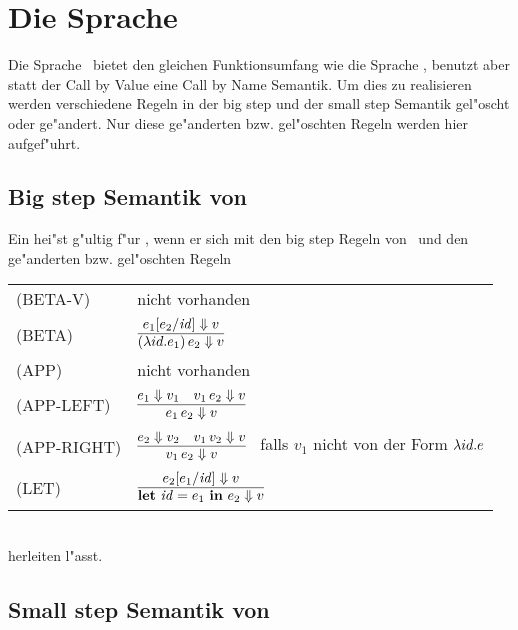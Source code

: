 \section{Die Sprache \LONECBN}

Die Sprache \LONECBN \ bietet den gleichen Funktionsumfang wie die Sprache \LONE, benutzt aber statt der 
Call by Value eine Call by Name Semantik. Um dies zu realisieren werden verschiedene Regeln in der big step 
und der small step Semantik gel"oscht oder ge"andert. Nur diese ge"anderten bzw. gel"oschten Regeln werden hier
aufgef"uhrt.

\subsection{Big step Semantik von \LONECBN}

Ein  hei"st g"ultig f"ur \LONECBN, wenn er sich mit den big step Regeln von \LONE\ und den ge"anderten bzw. gel"oschten Regeln\\[5mm]
  \begin{tabular}{ll}
     \mbox{(BETA-V)}      & nicht vorhanden \\[3mm]
     \mbox{(BETA)}        & $\regel{e_1[e_2/\id] \eval v}
                                   {(\abstr{id}{e_1})\,e_2 \eval v}$ \\[5mm]
     \mbox{(APP)}         & nicht vorhanden \\[3mm]
     \mbox{(APP-LEFT)}    & $\regel{e_1 \eval v_1 \quad v_1\,e_2 \eval v}
                                   {e_1\,e_2 \eval v}$ \\[3mm]
     \mbox{(APP-RIGHT)}   & $\regel{e_2 \eval v_2 \quad v_1\,v_2 \eval v}
                                   {v_1\,e_2 \eval v}$   \ 
                                   falls ${v_1}$ nicht von der Form $\lambda id.e$ \\[5mm]
     \mbox{(LET)}         & $\regel{e_2[e_1/\id] \eval v}
                                   {\bli{\id}{e_1}{e_2} \eval v}$
  \end{tabular}\\[7mm]
herleiten l"asst.


\subsection{Small step Semantik von \LONECBN}

